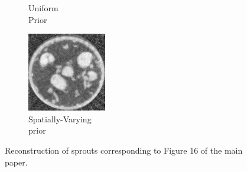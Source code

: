 \documentclass{article}
\begin{document}
\begin{figure}[!h]
\begin{subfigure}[b]{0.4\linewidth}
        \caption{Uniform\\ Prior}
     \end{subfigure}
\quad
    \begin{subfigure}[b]{0.4\linewidth}
        \includegraphics[width=\textwidth]{../images/sprouts/weightedPriorIm.png}
        \caption{Spatially-Varying\\ prior}
    \end{subfigure}
     \caption{Reconstruction of sprouts corresponding to Figure 16 of the main paper.} 
\label{fig:sprouts_3D_results_biggerIm}
\end{figure}
\end{document}
